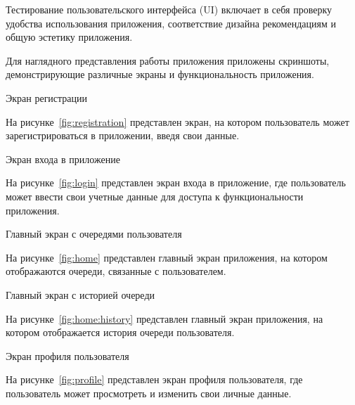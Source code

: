
Тестирование пользовательского интерфейса (UI) включает в себя
проверку удобства использования приложения,
соответствие дизайна рекомендациям и общую эстетику приложения.\par
Для наглядного представления работы приложения приложены скриншоты,
демонстрирующие различные экраны и функциональность приложения. 

\begin{image}
    \caption{Экран регистрации}
    \label{fig:registration}
\end{image}

На рисунке~\ref{fig:registration} представлен экран,
на котором пользователь может зарегистрироваться в приложении,
введя свои данные.

\begin{image}
    \caption{Экран входа в приложение}
    \label{fig:login}
\end{image}

На рисунке~\ref{fig:login} представлен экран входа в приложение,
где пользователь может ввести свои учетные данные для доступа
к функциональности приложения.

\begin{image}
    \caption{Главный экран с очередями пользователя}
    \label{fig:home}
\end{image}

На рисунке~\ref{fig:home} представлен главный экран приложения,
на котором отображаются очереди, связанные с пользователем.

\begin{image}
    \caption{Главный экран с историей очереди}
    \label{fig:home:history}
\end{image}

На рисунке~\ref{fig:home:history} представлен главный экран приложения,
на котором отображается история очереди пользователя.

\begin{image}
    \caption{Экран профиля пользователя}
    \label{fig:profile}
\end{image}

На рисунке~\ref{fig:profile} представлен экран профиля пользователя,
где пользователь может просмотреть и изменить свои личные данные.

